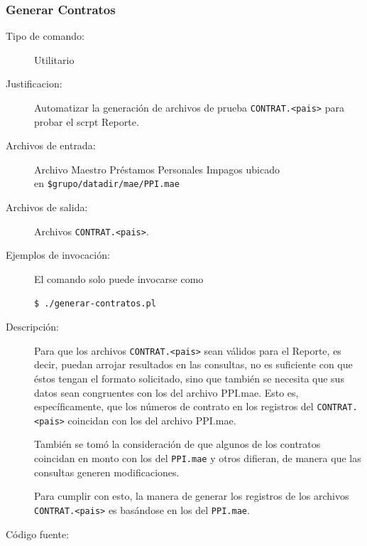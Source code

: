 \documentclass[12pt]{article}
\begin{document}
\subsubsection{Generar Contratos}
\begin{description}
	\item [Tipo de comando:] Utilitario
	
	\item [Justificacion: ] Automatizar la generaci\'on de archivos de prueba \verb|CONTRAT.<pais>| para probar el scrpt Reporte.
	\item [Archivos de entrada:] Archivo Maestro Préstamos Personales Impagos ubicado \\ en \verb|$grupo/datadir/mae/PPI.mae|
	\item [Archivos de salida:] Archivos \verb|CONTRAT.<pais>|.
	\item [Ejemplos de invocación:]	El comando solo puede invocarse como
	\begin{verbatim}$ ./generar-contratos.pl\end{verbatim}

	\item [Descripci\'on: ]
		Para que los archivos \verb|CONTRAT.<pais>| sean v\'alidos para el Reporte, es decir, puedan arrojar resultados en las consultas, no es suficiente con que \'estos tengan el formato solicitado, sino que tambi\'en se necesita que sus datos sean congruentes con los del archivo PPI.mae. Esto es, espec\'ificamente, que los n\'umeros de contrato en los registros del \verb|CONTRAT.<pais>| coincidan con los del archivo PPI.mae. 

		Tambi\'en se tom\'o la consideraci\'on de que algunos de los contratos coincidan en monto con los del \verb|PPI.mae| y otros difieran, de manera que las consultas generen modificaciones.

		Para cumplir con esto, la manera de generar los registros de los archivos \verb|CONTRAT.<pais>| es bas\'andose en los del \verb|PPI.mae|.
	\item [Código fuente:]

\end{description}
{\footnotesize

}
\end{document}
